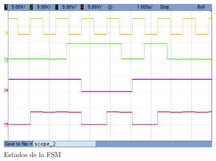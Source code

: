 \begin{figure}[H]
\begin{tabular}{c c}
    \end{tabular}
    \includegraphics[scale=0.2]{../EJ2/Mediciones/Estados/cropped_scope_2.png}
    \caption{Estados de la FSM}
    \label{fig:fsm_ejercicio_2_estados}
\end{figure}


